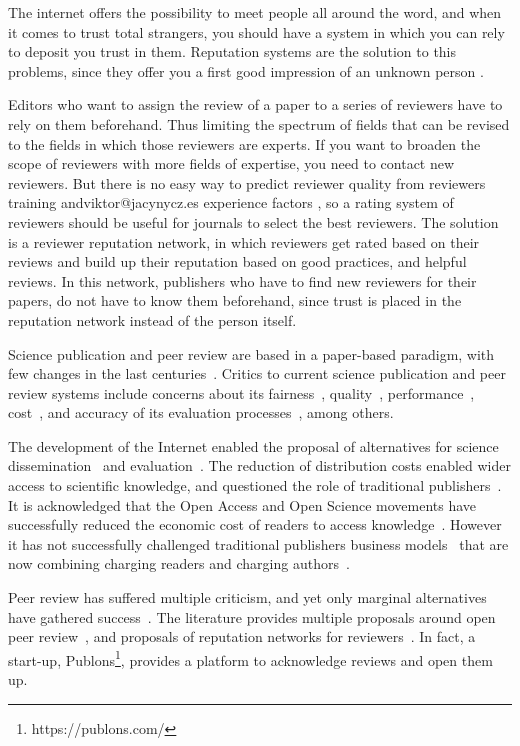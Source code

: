 The internet offers the possibility to meet people all around the word, and when
it comes to trust total strangers, you should have a system in which you can
rely to deposit you trust in them. Reputation systems are the solution to this
problems, since they offer you a first good impression of an unknown person
\cite{resnick2000reputation}.

Editors who want to assign the review of a paper to a series of reviewers have
to rely on them beforehand. Thus limiting the spectrum of fields that can be
revised to the fields in which those reviewers are experts. If you want to
broaden the scope of reviewers with more fields of expertise, you need to
contact new reviewers. But there is no easy way to predict reviewer quality from
reviewers training andviktor@jacynycz.es experience factors
\cite{callaham_relationship_2007}, so a rating system of reviewers should be
useful for journals to select the best reviewers. The solution is a reviewer
reputation network, in which reviewers get rated based on their reviews and
build up their reputation based on good practices, and helpful reviews. In this
network, publishers who have to find new reviewers for their papers, do not have
to know them beforehand, since trust is placed in the reputation network instead
of the person itself.

Science publication and peer review are based in a paper-based paradigm, with
few changes in the last centuries~\cite{spier2002history}. Critics to current
science publication and peer review systems include concerns about its
fairness~\cite{wenneras2001nepotism}, quality~\cite{goldbeck1999evidence},
performance~\cite{huisman2017duration}, cost~\cite{bergstrom2004costs}, and
accuracy of its evaluation processes~\cite{doi:10.1001/jama.295.1.90}, among
others.

The development of the Internet enabled the proposal of alternatives for science
dissemination~\cite{eysenbach2006citation} and
evaluation~\cite{walker_emerging_2015}. The reduction of distribution costs
enabled wider access to scientific knowledge, and questioned the role of
traditional publishers~\cite{ReinventingRigor}. It is acknowledged that the Open
Access and Open Science movements have successfully reduced the economic cost of
readers to access knowledge~\cite{evans2009open}. However it has not
successfully challenged traditional publishers business
models~\cite{lariviere2015oligopoly} that are now combining charging readers and
charging authors~\cite{van2013true}.

Peer review has suffered multiple criticism, and yet only marginal alternatives
have gathered success~\cite{ware2008peer}. The literature provides multiple
proposals around open peer review~\cite{ford2013defining}, and proposals of
reputation networks for reviewers~\cite{frishauf2009reputation}. In fact, a
start-up, Publons\footnote{https://publons.com/}, provides a platform to
acknowledge reviews and open them up.

